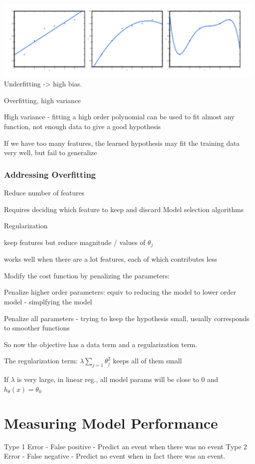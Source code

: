 \includegraphics[width=0.5\columnwidth]{ml_figures/overfitting.png}
Underfitting -> high bias.

Overfitting, high variance

High variance - fitting a high order polynomial can be used to fit almost any function, not enough data to give a good hypothesis

If we have too many features, the learned hypothesis may fit the training data very well, but fail to generalize

\subsubsection{Addressing Overfitting}

Reduce number of features

Requires deciding which feature to keep and discard
Model selection algorithms

Regularization

\item keep features but reduce magnitude / values of $\theta_j$ 
\item works well when there are a lot features, each of which contributes less

Modify the cost function by penalizing the parameters:

Penalize higher order parameters: equiv to reducing the model to lower order model - simplfying the model

Penalize all parameters  - trying to keep the hypothesis small, usually corresponds to smoother functions

So now the objective has a data term and a regularization term.

The regularization term: $\lambda\sum_{j=1} \theta_j^2 $ keeps all of them small

If $\lambda $ is very large, in linear reg., all model params will be close to 0 and $h_\theta(x) = \theta_0$  


\section{Measuring Model Performance}

Type 1 Error - False positive - Predict an event when there was no event
Type 2 Error - False negative - Predict no event when in fact there was an event.

